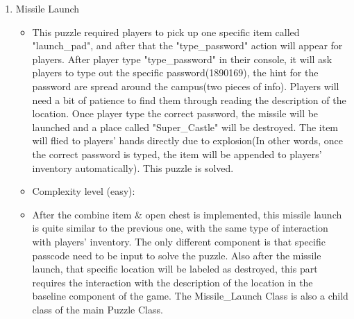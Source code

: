 \documentclass[11pt]{article}
\begin{document}
\begin{enumerate}
\item Missile Launch
	\begin{itemize}
	\item This puzzle required players to pick up one specific item called "launch_pad", and after that the "type_password" action will appear for players. After player type "type_password" in their console, it will ask players to type out the specific password(1890169), the hint for the password are spread around the campus(two pieces of info). Players will need a bit of patience to find them through reading the description of the location. Once player type the correct password, the missile will be launched and a place called "Super_Castle" will be destroyed. The item will flied to players' hands directly due to explosion(In other words, once the correct password is typed, the item will be appended to players' inventory automatically). This puzzle is solved.
	\item Complexity level (easy):
	\item After the combine item & open chest is implemented, this missile launch is quite similar to the previous one, with the same type of interaction with players' inventory. The only different component is that specific passcode need to be input to solve the puzzle. Also after the missile launch, that specific location will be labeled as destroyed, this part requires the interaction with the description of the location in the baseline component of the game. The Missile_Launch Class is also a child class of the main Puzzle Class.
	\end{itemize}


\end{enumerate}
\end{document}
